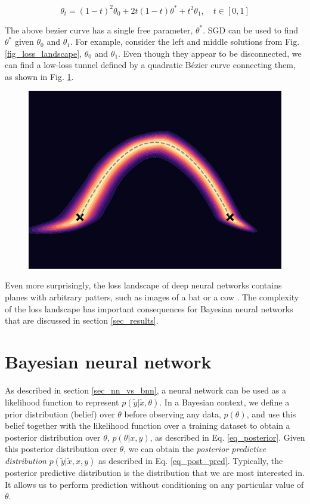 \documentclass[12pt]{article}
\begin{document}
\begin{equation}
\theta_t = (1-t)^2 \theta_0 + 2t(1-t) \theta^* + t^2 \theta_1, \quad t \in [0, 1]
\end{equation}

The above bezier curve has a single free parameter, $\theta^*$. SGD can be used to find $\theta^*$ given $\theta_0$ and $\theta_1$. For example, consider the left and middle solutions from Fig. \ref{fig_loss_landscape}, $\theta_0$ and $\theta_1$. Even though they appear to be disconnected, we can find a low-loss tunnel defined by a quadratic Bézier curve connecting them, as shown in Fig. \ref{fig_mode_connectivity}.

\begin{figure}[H]
\centering
\includegraphics[width=12cm]{plots/mode_connectivity.pdf}
\caption{}
\label{fig_mode_connectivity}
\end{figure}

Even more surprisingly, the loss landscape of deep neural networks contains planes with arbitrary patters, such as images of a bat or a cow \cite{sightseeing}. The complexity of the loss landscape has important consequences for Bayesian neural networks that are discussed in section \ref{sec_results}.

\section{Bayesian neural network}

As described in section \ref{sec_nn_vs_bnn}, a neural network can be used as a likelihood function to represent $p(\tilde{y} | \tilde{x}, \theta)$. In a Bayesian context, we define a prior distribution (belief) over $\theta$ before observing any data, $p(\theta)$, and use this belief together with the likelihood function over a training dataset to obtain a posterior distribution over $\theta$, $p(\theta | x, y)$, as described in Eq. \ref{eq_posterior}. Given this posterior distribution over $\theta$, we can obtain the \textit{posterior predictive distribution} $p(\tilde{y} | \tilde{x}, x, y)$ as described in Eq. \ref{eq_post_pred}. Typically, the posterior predictive distribution is the distribution that we are most interested in. It allows us to perform prediction without conditioning on any particular value of $\theta$.
\end{document}
